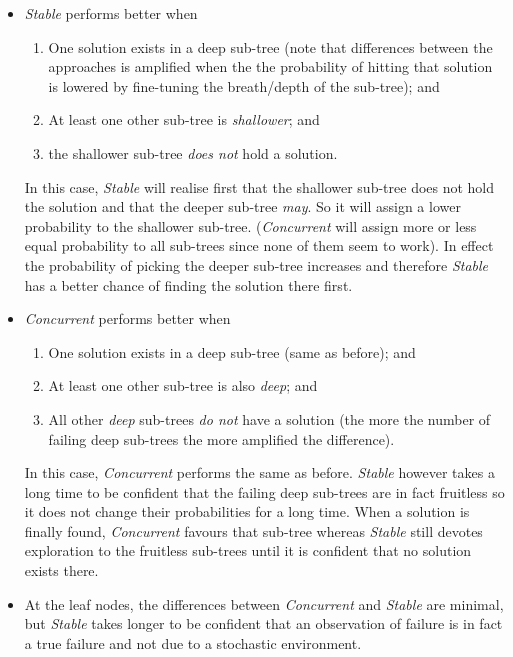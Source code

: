 \documentclass[a4paper]{article}
\newcommand{\cc}{\emph{Concurrent}\xspace}
\newcommand{\st}{\emph{Stable}\xspace}
\begin{document}
\begin{itemize}
\item \st performs better when
\begin{enumerate}
\item One solution exists in a deep sub-tree (note that differences between the approaches is amplified when the the probability of hitting that solution is lowered by fine-tuning the breath/depth of the sub-tree); and
\item At least one other sub-tree is \emph{shallower}; and
\item the shallower sub-tree \emph{does not} hold a solution.
\end{enumerate}

In this case, \st will realise first that the shallower sub-tree does not hold the solution and that the deeper sub-tree \emph{may}. So it will assign a lower probability to the shallower sub-tree. (\cc will assign more or less equal probability to all sub-trees since none of them seem to work). In effect the probability of picking the deeper sub-tree increases and therefore \st has a better chance of finding the solution there first.

\item \cc performs better when
\begin{enumerate}
\item One solution exists in a deep sub-tree (same as before); and
\item At least one other sub-tree is also \emph{deep}; and
\item All other \emph{deep} sub-trees \emph{do not} have a solution (the more the number of failing deep sub-trees the more amplified the difference).
\end{enumerate}

In this case, \cc performs the same as before. \st however takes a long time to be confident that the failing deep sub-trees are in fact fruitless so it does not change their probabilities for a long time. When a solution is finally found, \cc favours that sub-tree whereas \st still devotes exploration to the fruitless sub-trees until it is confident that no solution exists there.

\item At the leaf nodes, the differences between \cc and \st are minimal, but \st takes longer to be confident that an observation of failure is in fact a true failure and not due to a stochastic environment.

\end{itemize}
\end{document}
